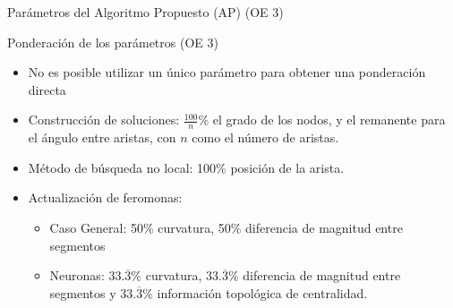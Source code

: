 
\begin{frame}{Par\'ametros del Algoritmo Propuesto (AP) (OE 3)}
    \centering
\end{frame}

\begin{frame}{Ponderaci\'on de los par\'ametros (OE 3)}

    \begin{itemize}%
    \item No es posible utilizar un \'unico par\'ametro para obtener una ponderaci\'on directa
    \item Construcci\'on de soluciones: $\frac{100}{n}$\% el grado de los nodos, y el remanente para el \'angulo entre aristas, con $n$ como el n\'umero de aristas.
    \item M\'etodo de b\'usqueda no local: 100\% posici\'on de la arista.
    \item Actualizaci\'on de feromonas: 
    \begin{itemize}%
        \item Caso General: 50\% curvatura, 50\% diferencia de magnitud entre segmentos
        \item Neuronas: $33.\overline{3}\%$ curvatura, $33.\overline{3}\%$ diferencia de magnitud entre segmentos y $33.\overline{3}\%$ informaci\'on topol\'ogica de centralidad.
    \end{itemize}
\end{itemize}
\end{frame}

